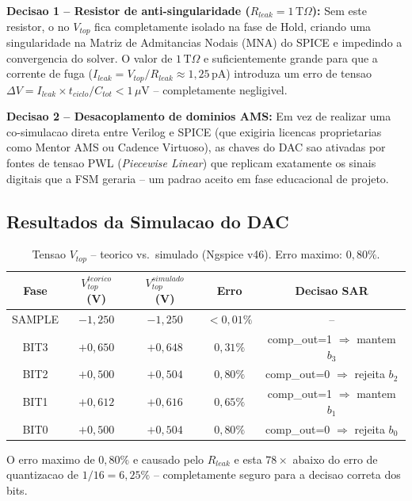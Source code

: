 \documentclass[12pt, a4paper]{article}
\begin{document}
\textbf{Decisao 1 -- Resistor de anti-singularidade ($R_{leak} = 1\,\text{T}\Omega$):}
Sem este resistor, o no $V_{top}$ fica completamente isolado na fase de Hold, criando uma
singularidade na Matriz de Admitancias Nodais (MNA) do SPICE e impedindo a convergencia do
solver. O valor de $1\,\text{T}\Omega$ e suficientemente grande para que a corrente de fuga
($I_{leak} = V_{top}/R_{leak} \approx 1{,}25\,\text{pA}$) introduza um erro de tensao
$\Delta V = I_{leak} \times t_{ciclo} / C_{tot} < 1\,\mu\text{V}$ -- completamente negligivel.

\textbf{Decisao 2 -- Desacoplamento de dominios AMS:} Em vez de realizar uma co-simulacao
direta entre Verilog e SPICE (que exigiria licencas proprietarias como Mentor AMS ou Cadence
Virtuoso), as chaves do DAC sao ativadas por fontes de tensao PWL (\textit{Piecewise Linear})
que replicam exatamente os sinais digitais que a FSM geraria -- um padrao aceito em fase
educacional de projeto.

\subsection{Resultados da Simulacao do DAC}

\begin{table}[H]
\centering
\caption{Tensao $V_{top}$ -- teorico vs.\ simulado (Ngspice v46). Erro maximo: $0{,}80\%$.}
\label{tab:sim_spice}
\begin{tabular}{ccccc}
\toprule
\textbf{Fase} & $V_{top}^{teorico}$ (V) & $V_{top}^{simulado}$ (V) & \textbf{Erro} & \textbf{Decisao SAR}\\
\midrule
SAMPLE  & $-1{,}250$ & $-1{,}250$ & $<0{,}01\%$ & -- \\
BIT3    & $+0{,}650$ & $+0{,}648$ & $0{,}31\%$  & comp\_out=1 $\Rightarrow$ mantem $b_3$ \\
BIT2    & $+0{,}500$ & $+0{,}504$ & $0{,}80\%$  & comp\_out=0 $\Rightarrow$ rejeita $b_2$ \\
BIT1    & $+0{,}612$ & $+0{,}616$ & $0{,}65\%$  & comp\_out=1 $\Rightarrow$ mantem $b_1$ \\
BIT0    & $+0{,}500$ & $+0{,}504$ & $0{,}80\%$  & comp\_out=0 $\Rightarrow$ rejeita $b_0$ \\
\bottomrule
\end{tabular}
\end{table}

O erro maximo de $0{,}80\%$ e causado pelo $R_{leak}$ e esta $78\times$ abaixo do erro de
quantizacao de $1/16 = 6{,}25\%$ -- completamente seguro para a decisao correta dos bits.
\end{document}
